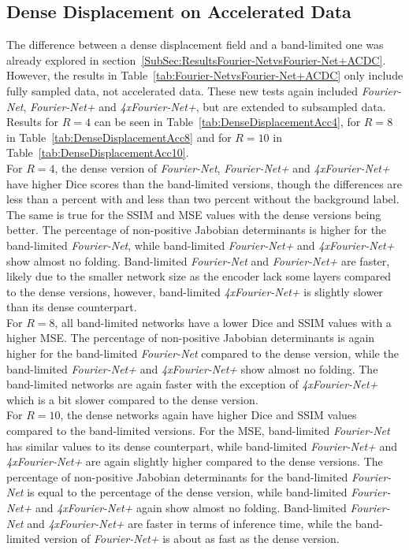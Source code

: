 \subsection{Dense Displacement on Accelerated Data} \label{SubSec:ResultsDenseDisplacementAcc}
The difference between a dense displacement field and a band-limited one was already explored in section~\ref{SubSec:ResultsFourier-NetvsFourier-Net+ACDC}. However, the results in Table~\ref{tab:Fourier-NetvsFourier-Net+ACDC} only include fully sampled data, not accelerated data. These new tests again included \emph{Fourier-Net}, \emph{Fourier-Net+} and \emph{4xFourier-Net+}, but are extended to subsampled data. Results for $R=4$ can be seen in Table~\ref{tab:DenseDisplacementAcc4}, for $R=8$ in Table~\ref{tab:DenseDisplacementAcc8} and for $R=10$ in Table~\ref{tab:DenseDisplacementAcc10}. \\
For $R=4$, the dense version of \emph{Fourier-Net}, \emph{Fourier-Net+} and \emph{4xFourier-Net+} have higher Dice scores than the band-limited versions, though the differences are less than a percent with and less than two percent without the background label. The same is true for the SSIM and MSE values with the dense versions being better. The percentage of non-positive Jabobian determinants is higher for the band-limited \emph{Fourier-Net}, while band-limited \emph{Fourier-Net+} and \emph{4xFourier-Net+} show almost no folding. 
Band-limited \emph{Fourier-Net} and \emph{Fourier-Net+} are faster, likely due to the smaller network size as the encoder lack some layers compared to the dense versions, however, band-limited \emph{4xFourier-Net+} is slightly slower than its dense counterpart.\\
For $R=8$, all band-limited networks have a lower Dice and SSIM values with a higher MSE. The percentage of non-positive Jabobian determinants is again higher for the band-limited \emph{Fourier-Net} compared to the dense version, while the band-limited \emph{Fourier-Net+} and \emph{4xFourier-Net+} show almost no folding. The band-limited networks are again faster with the exception of \emph{4xFourier-Net+} which is a bit slower compared to the dense version. \\
For $R=10$, the dense networks again have higher Dice and SSIM values compared to the band-limited versions. For the MSE, band-limited \emph{Fourier-Net} has similar values to its dense counterpart, while band-limited \emph{Fourier-Net+} and \emph{4xFourier-Net+} are again slightly higher compared to the dense versions. The percentage of non-positive Jabobian determinants for the band-limited \emph{Fourier-Net} is equal to the percentage of the dense version, while band-limited \emph{Fourier-Net+} and \emph{4xFourier-Net+} again show almost no folding. Band-limited \emph{Fourier-Net} and \emph{4xFourier-Net+} are faster in terms of inference time, while the band-limited version of \emph{Fourier-Net+} is about as fast as the dense version.


